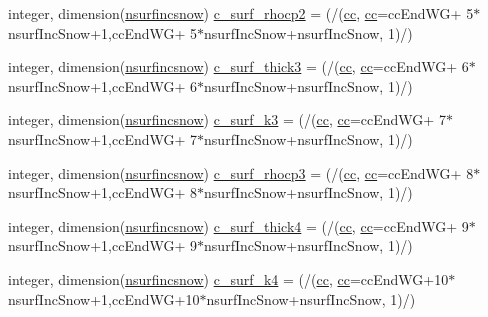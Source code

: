 \begin{DoxyCompactItemize}
\item 
integer, dimension(\hyperlink{namespaceallocatearray_af4d113f332b6759cfa22271140c9162d}{nsurfincsnow}) \hyperlink{namespaceallocatearray_a11520098b1a1428ee68c6a7a1b292b53}{c\+\_\+surf\+\_\+rhocp2} = (/(\hyperlink{namespaceallocatearray_ac863c81704eb507dee10f5e10741e10c}{cc}, \hyperlink{namespaceallocatearray_ac863c81704eb507dee10f5e10741e10c}{cc}=cc\+End\+WG+ 5$\ast$nsurf\+Inc\+Snow+1,cc\+End\+WG+ 5$\ast$nsurf\+Inc\+Snow+nsurf\+Inc\+Snow, 1)/)
\item 
integer, dimension(\hyperlink{namespaceallocatearray_af4d113f332b6759cfa22271140c9162d}{nsurfincsnow}) \hyperlink{namespaceallocatearray_a6e64c0458fe3780a6b81c02c9c18c87f}{c\+\_\+surf\+\_\+thick3} = (/(\hyperlink{namespaceallocatearray_ac863c81704eb507dee10f5e10741e10c}{cc}, \hyperlink{namespaceallocatearray_ac863c81704eb507dee10f5e10741e10c}{cc}=cc\+End\+WG+ 6$\ast$nsurf\+Inc\+Snow+1,cc\+End\+WG+ 6$\ast$nsurf\+Inc\+Snow+nsurf\+Inc\+Snow, 1)/)
\item 
integer, dimension(\hyperlink{namespaceallocatearray_af4d113f332b6759cfa22271140c9162d}{nsurfincsnow}) \hyperlink{namespaceallocatearray_abd4d53cdda7a49efd6e747ac3c599869}{c\+\_\+surf\+\_\+k3} = (/(\hyperlink{namespaceallocatearray_ac863c81704eb507dee10f5e10741e10c}{cc}, \hyperlink{namespaceallocatearray_ac863c81704eb507dee10f5e10741e10c}{cc}=cc\+End\+WG+ 7$\ast$nsurf\+Inc\+Snow+1,cc\+End\+WG+ 7$\ast$nsurf\+Inc\+Snow+nsurf\+Inc\+Snow, 1)/)
\item 
integer, dimension(\hyperlink{namespaceallocatearray_af4d113f332b6759cfa22271140c9162d}{nsurfincsnow}) \hyperlink{namespaceallocatearray_aa72f745011098db1badf39ab33cea273}{c\+\_\+surf\+\_\+rhocp3} = (/(\hyperlink{namespaceallocatearray_ac863c81704eb507dee10f5e10741e10c}{cc}, \hyperlink{namespaceallocatearray_ac863c81704eb507dee10f5e10741e10c}{cc}=cc\+End\+WG+ 8$\ast$nsurf\+Inc\+Snow+1,cc\+End\+WG+ 8$\ast$nsurf\+Inc\+Snow+nsurf\+Inc\+Snow, 1)/)
\item 
integer, dimension(\hyperlink{namespaceallocatearray_af4d113f332b6759cfa22271140c9162d}{nsurfincsnow}) \hyperlink{namespaceallocatearray_a1d34ddb04c02fc201a2a1f467ab5afe0}{c\+\_\+surf\+\_\+thick4} = (/(\hyperlink{namespaceallocatearray_ac863c81704eb507dee10f5e10741e10c}{cc}, \hyperlink{namespaceallocatearray_ac863c81704eb507dee10f5e10741e10c}{cc}=cc\+End\+WG+ 9$\ast$nsurf\+Inc\+Snow+1,cc\+End\+WG+ 9$\ast$nsurf\+Inc\+Snow+nsurf\+Inc\+Snow, 1)/)
\item 
integer, dimension(\hyperlink{namespaceallocatearray_af4d113f332b6759cfa22271140c9162d}{nsurfincsnow}) \hyperlink{namespaceallocatearray_ad37f821b9c923544adca4561e173b0ec}{c\+\_\+surf\+\_\+k4} = (/(\hyperlink{namespaceallocatearray_ac863c81704eb507dee10f5e10741e10c}{cc}, \hyperlink{namespaceallocatearray_ac863c81704eb507dee10f5e10741e10c}{cc}=cc\+End\+WG+10$\ast$nsurf\+Inc\+Snow+1,cc\+End\+WG+10$\ast$nsurf\+Inc\+Snow+nsurf\+Inc\+Snow, 1)/)

\end{DoxyCompactItemize}
